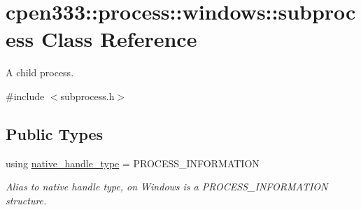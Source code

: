 \hypertarget{classcpen333_1_1process_1_1windows_1_1subprocess}{}\section{cpen333\+:\+:process\+:\+:windows\+:\+:subprocess Class Reference}
\label{classcpen333_1_1process_1_1windows_1_1subprocess}


A child process.  




{\ttfamily \#include $<$subprocess.\+h$>$}

\subsection*{Public Types}
\begin{DoxyCompactItemize}
\item 
\mbox{\label{classcpen333_1_1process_1_1windows_1_1subprocess_a579616d8fd1401a85aae1046412f451d}} 
using \hyperlink{classcpen333_1_1process_1_1windows_1_1subprocess_a579616d8fd1401a85aae1046412f451d}{native\+\_\+handle\+\_\+type} = P\+R\+O\+C\+E\+S\+S\+\_\+\+I\+N\+F\+O\+R\+M\+A\+T\+I\+ON
\begin{DoxyCompactList}\small\item\em Alias to native handle type, on Windows is a P\+R\+O\+C\+E\+S\+S\+\_\+\+I\+N\+F\+O\+R\+M\+A\+T\+I\+ON structure. \end{DoxyCompactList}\end{DoxyCompactItemize}

